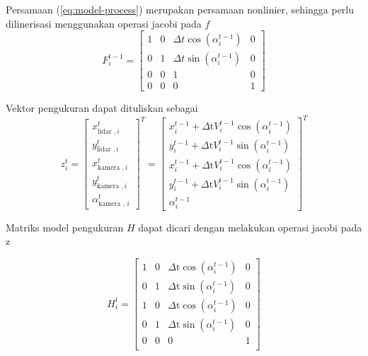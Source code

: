 \begin{frame}[allowframebreaks]
    Persamaan (\ref{eq:model-process}) merupakan persamaan nonlinier, sehingga perlu dilinerisasi menggunakan operasi jacobi pada $f$
    \begin{equation}
        F_{i}^{t-1}=\left[\begin{array}{cccc}
        1 & 0 & \Delta t \cos \left(\alpha_{i}^{t-1}\right) & 0 \\
        0 & 1 & \Delta t \sin \left(\alpha_{i}^{t-1}\right) & 0 \\
        0 & 0 & 1 & 0 \\
        0 & 0 & 0 & 1
        \end{array}\right]
    \end{equation}

    Vektor pengukuran dapat dituliskan sebagai
    \begin{equation}
        z_{i}^{t}=\left[\begin{array}{c}
        x_{\text {lidar }, i}^{t} \\
        y_{\text {lidar }, i}^{t} \\
        x_{\text {kamera }, i}^{t} \\
        y_{\text {kamera }, i}^{t} \\
        \alpha_{\text {kamera , } i}^{t}
        \end{array}\right]^{T}=\left[\begin{array}{c}
        x_{i}^{t-1}+\Delta \mathrm{t} V_{i}^{t-1} \cos \left(\alpha_{i}^{t-1}\right) \\
        y_{i}^{t-1}+\Delta \mathrm{t} V_{i}^{t-1} \sin \left(\alpha_{i}^{t-1}\right) \\
        x_{i}^{t-1}+\Delta \mathrm{t} V_{i}^{t-1} \cos \left(\alpha_{i}^{t-1}\right) \\
        y_{i}^{t-1}+\Delta \mathrm{t} V_{i}^{t-1} \sin \left(\alpha_{i}^{t-1}\right) \\
        \alpha_{i}^{t-1}
        \end{array}\right]^T
    \end{equation}

    Matriks model pengukuran $H$ dapat dicari dengan melakukan operasi jacobi pada z

    \begin{equation}
        H_{i}^{t}=\left[\begin{array}{ccccc}
        1 & 0 & \Delta \mathrm{t} \cos \left(\alpha_{i}^{t-1}\right) & 0 \\
        0 & 1 & \Delta \mathrm{t} \sin \left(\alpha_{i}^{t-1}\right) & 0 \\
        1 & 0 & \Delta \mathrm{t} \cos \left(\alpha_{i}^{t-1}\right) & 0 \\
        0 & 1 & \Delta \mathrm{t} \sin \left(\alpha_{i}^{t-1}\right) & 0 \\
        0 & 0 & 0 & 1 \\
        \end{array}\right]
    \end{equation}
\end{frame}


